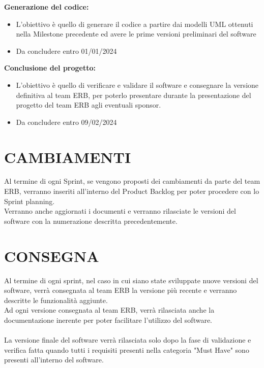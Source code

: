 \documentclass{report}
\begin{document}
\textbf{Generazione del codice:}
\begin{itemize}
\item L'obiettivo è quello di generare il codice a partire dai modelli UML ottenuti nella Milestone precedente ed avere le prime versioni preliminari del software
\item Da concludere entro 01/01/2024
\end{itemize}

\textbf{Conclusione del progetto:}
\begin{itemize}
\item L'obiettivo è quello di verificare e validare il software e consegnare la versione definitiva al team ERB, per poterlo presentare durante la presentazione del progetto del team ERB agli eventuali sponsor.
\item Da concludere entro 09/02/2024
\end{itemize}

\chapter{CAMBIAMENTI}
Al termine di ogni Sprint, se vengono proposti dei cambiamenti da parte del team ERB, verranno inseriti all'interno del Product Backlog per poter procedere con lo Sprint planning.\\
Verranno anche aggiornati i documenti e verranno rilasciate le versioni del software con la numerazione descritta precedentemente.

\begingroup
\let\clearpage\relax
\chapter{CONSEGNA}
\endgroup

Al termine di ogni sprint, nel caso in cui siano state sviluppate nuove versioni del software, verrà consegnata al team ERB la versione più recente e verranno descritte le funzionalità aggiunte.\\
Ad ogni versione consegnata al team ERB, verrà rilasciata anche la documentazione inerente per poter facilitare l'utilizzo del software.\\\\
La versione finale del software verrà rilasciata solo dopo la fase di validazione e verifica fatta quando tutti i requisiti presenti nella categoria "Must Have" sono presenti all'interno del software.
\end{document}
